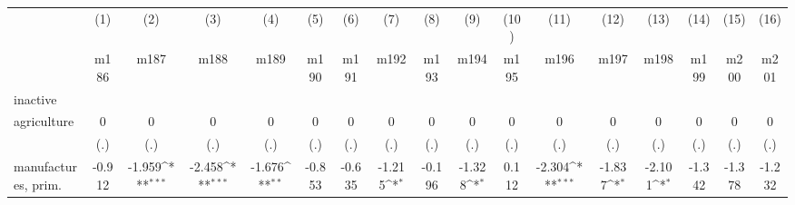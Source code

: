 {
\def\sym#1{\ifmmode^{#1}\else\(^{#1}\)\fi}
\begin{tabular}{l*{16}{c}}
\hline\hline
                    &\multicolumn{1}{c}{(1)}&\multicolumn{1}{c}{(2)}&\multicolumn{1}{c}{(3)}&\multicolumn{1}{c}{(4)}&\multicolumn{1}{c}{(5)}&\multicolumn{1}{c}{(6)}&\multicolumn{1}{c}{(7)}&\multicolumn{1}{c}{(8)}&\multicolumn{1}{c}{(9)}&\multicolumn{1}{c}{(10)}&\multicolumn{1}{c}{(11)}&\multicolumn{1}{c}{(12)}&\multicolumn{1}{c}{(13)}&\multicolumn{1}{c}{(14)}&\multicolumn{1}{c}{(15)}&\multicolumn{1}{c}{(16)}\\
                    &\multicolumn{1}{c}{m186}&\multicolumn{1}{c}{m187}&\multicolumn{1}{c}{m188}&\multicolumn{1}{c}{m189}&\multicolumn{1}{c}{m190}&\multicolumn{1}{c}{m191}&\multicolumn{1}{c}{m192}&\multicolumn{1}{c}{m193}&\multicolumn{1}{c}{m194}&\multicolumn{1}{c}{m195}&\multicolumn{1}{c}{m196}&\multicolumn{1}{c}{m197}&\multicolumn{1}{c}{m198}&\multicolumn{1}{c}{m199}&\multicolumn{1}{c}{m200}&\multicolumn{1}{c}{m201}\\
\hline
inactive            &                     &                     &                     &                     &                     &                     &                     &                     &                     &                     &                     &                     &                     &                     &                     &                     \\
agriculture         &           0         &           0         &           0         &           0         &           0         &           0         &           0         &           0         &           0         &           0         &           0         &           0         &           0         &           0         &           0         &           0         \\
                    &         (.)         &         (.)         &         (.)         &         (.)         &         (.)         &         (.)         &         (.)         &         (.)         &         (.)         &         (.)         &         (.)         &         (.)         &         (.)         &         (.)         &         (.)         &         (.)         \\
[1em]
manufactures, prim. &      -0.912         &      -1.959\sym{***}&      -2.458\sym{***}&      -1.676\sym{**} &      -0.853         &      -0.635         &      -1.215\sym{*}  &      -0.196         &      -1.328\sym{*}  &       0.112         &      -2.304\sym{***}&      -1.837\sym{*}  &      -2.101\sym{*}  &      -1.342         &      -1.378         &      -1.232         \\

\end{tabular}}
